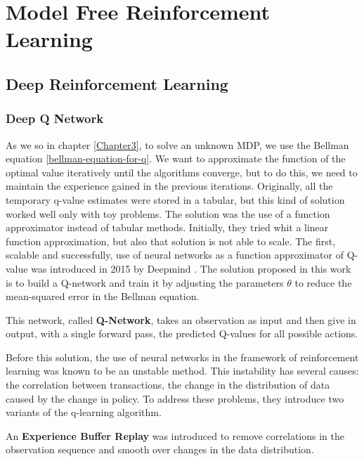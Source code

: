 
\chapter{Model Free Reinforcement Learning} %

\label{Chapter4} %

\section{Deep Reinforcement Learning}
\subsection{Deep Q Network}

As we so in chapter \ref{Chapter3}, to solve an unknown MDP, we use the Bellman equation \ref{bellman-equation-for-q}.
We want to approximate the function of the optimal value iteratively until the algorithms converge, but to do this, we need to maintain the experience gained in the previous iterations.
Originally, all the temporary q-value estimates were stored in a tabular, but this kind of solution worked well only with toy problems.
The solution was the use of a function approximator instead of tabular methods.
Initially, they tried whit a linear function approximation, but also that solution is not able to scale.
The first, scalable and successfully, use of neural networks as a function approximator of Q-value was introduced in 2015 by Deepmind \cite{mnih2015human}.
The solution proposed in this work is to build a Q-network and train it by adjusting the parameters $ \theta $ to reduce the mean-squared error in the Bellman equation.

This network, called \textbf{Q-Network}, takes an observation as input and then give in output, with a single forward pass, the predicted Q-values for all possible actions.

Before this solution, the use of neural networks in the framework of reinforcement learning was known to be an unstable method.
This instability has several causes: the correlation between transactions, the change in the distribution of data caused by the change in policy.
To address these problems, they introduce two variants of the q-learning algorithm. 

An \textbf{Experience Buffer Replay} was introduced to remove correlations in the observation sequence and smooth over changes in the data distribution.

